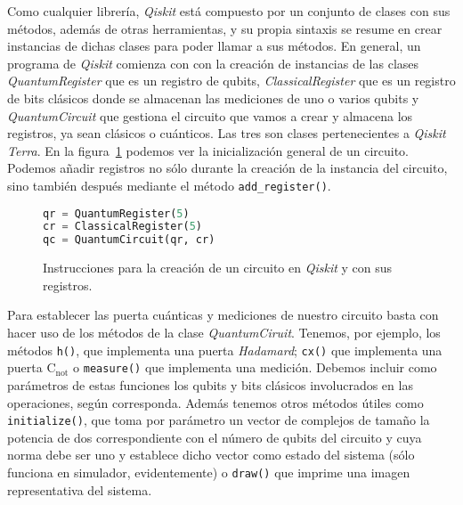 Como cualquier librería, \textit{Qiskit} está compuesto por un conjunto de clases con sus métodos, además de otras herramientas, y su propia sintaxis se resume en crear instancias de dichas clases para poder llamar a sus métodos. En general, un programa de \textit{Qiskit} comienza con con la creación de instancias de las clases \textit{QuantumRegister} que es un registro de qubits, \textit{ClassicalRegister} que es un registro de bits clásicos donde se almacenan las mediciones de uno o varios qubits y \textit{QuantumCircuit} que gestiona el circuito que vamos a crear y almacena los registros, ya sean clásicos o cuánticos. Las tres son clases pertenecientes a \textit{Qiskit Terra}. En la figura~\ref{fig:code51} podemos ver la inicialización general de un circuito. Podemos añadir registros no sólo durante la creación de la instancia del circuito, sino también después mediante el método \texttt{add\_register()}.

\begin{figure}[b]
\begin{lstlisting}[language=Python]
qr = QuantumRegister(5)
cr = ClassicalRegister(5)
qc = QuantumCircuit(qr, cr)
\end{lstlisting}
\caption{Instrucciones para la creación de un circuito en \textit{Qiskit} y con sus registros.}
\label{fig:code51}
\end{figure}

Para establecer las puerta cuánticas y mediciones de nuestro circuito basta con hacer uso de los métodos de la clase \textit{QuantumCiruit}. Tenemos, por ejemplo, los métodos \texttt{h()}, que implementa una puerta \textit{Hadamard}; \texttt{cx()} que implementa una puerta C$_\mathrm{not}$ o \texttt{measure()} que implementa una medición. Debemos incluir como parámetros de estas funciones los qubits y bits clásicos involucrados en las operaciones, según corresponda. Además tenemos otros métodos útiles como \texttt{initialize()}, que toma por parámetro un vector de complejos de tamaño la potencia de dos correspondiente con el número de qubits del circuito y cuya norma debe ser uno y establece dicho vector como estado del sistema (sólo funciona en simulador, evidentemente) o \texttt{draw()} que imprime una imagen representativa del sistema.

